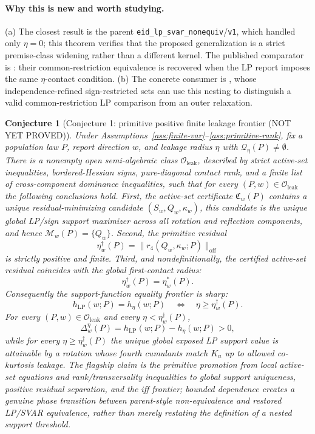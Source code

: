 \documentclass[11pt]{article}
\theoremstyle{definition}
\theoremstyle{plain}
\newtheorem{conjecture}{Conjecture}
\theoremstyle{remark}
\begin{document}
\paragraph{Why this is new and worth studying.}
(a) The closest result is the parent \texttt{eid\_lp\_svar\_nonequiv}/\texttt{v1}, which handled only \(\eta=0\); this theorem verifies that the proposed generalization is a strict premise-class widening rather than a different kernel.  The published comparator is \citet{PlagborgMollerWolf2021}: their common-restriction equivalence is recovered when the LP report imposes the same \(\eta\)-contact condition.  (b) The concrete consumer is \citet{DrautzburgWright2023}, whose independence-refined sign-restricted sets can use this nesting to distinguish a valid common-restriction LP comparison from an outer relaxation.

\begin{conjecture}[Conjecture 1: primitive positive finite leakage frontier (NOT YET PROVED)]\label{conj:critical-leakage-frontier}
Under Assumptions~\ref{ass:finite-var}--\ref{ass:primitive-rank}, fix a population law \(P\), report direction \(w\), and leakage radius \(\eta\) with \(\mathcal Q_\eta(P)\ne\emptyset\).  There is a nonempty open semi-algebraic class \(\mathcal O_{\mathrm{leak}}\), described by strict active-set inequalities, bordered-Hessian signs, pure-diagonal contact rank, and a finite list of cross-component dominance inequalities, such that for every \((P,w)\in\mathcal O_{\mathrm{leak}}\) the following conclusions hold.  First, the active-set certificate \(\mathfrak C_w(P)\) contains a unique residual-minimizing candidate \((S_w,Q_w,\kappa_w)\), this candidate is the unique global LP/sign support maximizer across all rotation and reflection components, and hence \(\mathcal M_w(P)=\{Q_w\}\).  Second, the primitive residual
\[
\eta_w^\dagger(P)=\|r_4(Q_w,\kappa_w;P)\|_{\mathrm{off}}
\]
is strictly positive and finite.  Third, and nondefinitionally, the certified active-set residual coincides with the global first-contact radius:
\[
\eta_w^\dagger(P)=\eta_w^*(P).
\]
Consequently the support-function equality frontier is sharp:
\[
h_{\mathrm{LP}}(w;P)=h_\eta(w;P)
\quad\Longleftrightarrow\quad
\eta\ge \eta_w^\dagger(P).
\]
For every \((P,w)\in\mathcal O_{\mathrm{leak}}\) and every \(\eta<\eta_w^\dagger(P)\),
\[
\Delta_w^\eta(P)=h_{\mathrm{LP}}(w;P)-h_\eta(w;P)>0,
\]
while for every \(\eta\ge\eta_w^\dagger(P)\) the unique global exposed LP support value is attainable by a rotation whose fourth cumulants match \(K_u\) up to allowed co-kurtosis leakage.  The flagship claim is the primitive promotion from local active-set equations and rank/transversality inequalities to global support uniqueness, positive residual separation, and the iff frontier; bounded dependence creates a genuine phase transition between parent-style non-equivalence and restored LP/SVAR equivalence, rather than merely restating the definition of a nested support threshold.
\end{conjecture}
\end{document}
